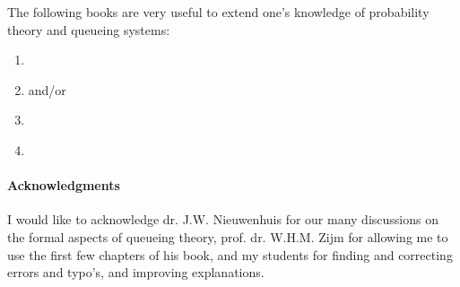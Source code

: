 The following books are very useful to extend one's knowledge of probability theory and queueing systems:
\begin{enumerate}
\item \citet{capinski03:_probab_probl}
\item \citet{tijms94:_stoch_model_algor_approac} and/or \citet{tijms03:_first_cours_stoch_model}
\item \citet{el-taha98:_sampl_path_analy_queuein_system}
\item \citet{bolch06:_queuein_networ_markov_chain}
\end{enumerate}

\paragraph{Acknowledgments}

I would like to acknowledge dr.
J.W.
Nieuwenhuis for our many discussions on the formal aspects of queueing theory, prof.
dr.
W.H.M.
Zijm for allowing me to use the first few chapters of his book, and my students for finding and correcting errors and typo's, and improving explanations.



